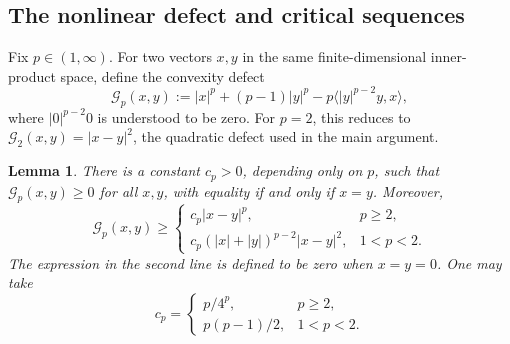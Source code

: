 \documentclass[12pt]{amsart}
\newtheorem{lemma}[theorem]{Lemma}
\theoremstyle{definition}
\numberwithin{equation}{section}
\newcommand{\mc}{\mathcal}
\begin{document}
\subsection{The nonlinear defect and critical sequences}

Fix \(p\in(1,\infty)\).  For two vectors \(x,y\) in the same
finite-dimensional inner-product space, define the convexity defect
\begin{equation}\label{eq:p-convexity-defect}
  \mc G_p(x,y)
  :=|x|^p+(p-1)|y|^p
    -p\langle |y|^{p-2}y,x\rangle,
\end{equation}
where \(|0|^{p-2}0\) is understood to be zero.
For \(p=2\), this reduces to
\(\mc G_2(x,y)=|x-y|^2\), the quadratic defect used in the main
argument.

\begin{lemma}\label{lem:p-uniform-convexity}
There is a constant \(c_p>0\), depending only on \(p\), such that
\(\mc G_p(x,y)\geq0\) for all \(x,y\), with equality if and only if
\(x=y\).  Moreover,
\[
  \mc G_p(x,y)\geq
  \begin{cases}
    c_p|x-y|^p,
      &p\geq2,\\[2mm]
    c_p(|x|+|y|)^{p-2}|x-y|^2,
      &1<p<2.
  \end{cases}
\]
The expression in the second line is defined to be zero when \(x=y=0\).
One may take
\[
  c_p=
  \begin{cases}
    p/4^p, & p\geq2,\\[1mm]
    p(p-1)/2, & 1<p<2.
  \end{cases}
\]
\end{lemma}
\end{document}
